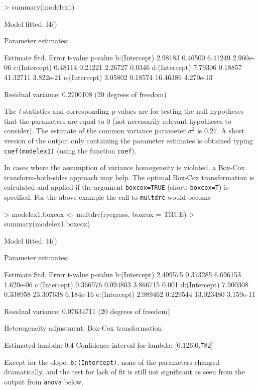 \documentclass[a4paper]{article}
\begin{document}
\begin{Schunk}
\begin{Sinput}
> summary(modelex1)
\end{Sinput}
\begin{Soutput}
Model fitted: l4()

Parameter estimates:

              Estimate Std. Error  t-value   p-value
b:(Intercept)  2.98183    0.46500  6.41249 2.960e-06
c:(Intercept)  0.48114    0.21221  2.26727    0.0346
d:(Intercept)  7.79306    0.18857 41.32711 3.822e-21
e:(Intercept)  3.05802    0.18574 16.46386 4.270e-13

Residual variance: 0.2700108 (20 degrees of freedom)
\end{Soutput}
\end{Schunk}
The \emph{t}-statistics and corresponding p-values are for testing the null hypotheses that the parameters are equal to 0 (not
necessarily relevant hypotheses to consider). The estimate of the common variance parameter $\sigma^2$ is 
0.27.
A short version of the output only containing the parameter estimates is obtained typing \verb+coef(modelex1)+ (using the function \verb+coef+).



In cases where the assumption of variance homogeneity is violated, a Box-Cox transform-both-sides approach may help. The optimal
Box-Cox transformation is calculated and applied if the argument \verb+boxcox=TRUE+ (short: \verb+boxcox=T+) is specified. For the
above example the call to \verb+multdrc+ would become

\begin{Schunk}
\begin{Sinput}
> modelex1.boxcox <- multdrc(ryegrass, boxcox = TRUE)
> summary(modelex1.boxcox)
\end{Sinput}
\begin{Soutput}
Model fitted: l4()

Parameter estimates:

               Estimate Std. Error   t-value   p-value
b:(Intercept)  2.499575   0.373285  6.696153 1.620e-06
c:(Intercept)  0.366576   0.094803  3.866715     0.001
d:(Intercept)  7.900308   0.338958 23.307638 6.184e-16
e:(Intercept)  2.989462   0.229544 13.023480 3.159e-11

Residual variance: 0.07634711 (20 degrees of freedom)

Heterogeneity adjustment: Box-Cox transformation

Estimated lambda: 0.4 
Confidence interval for lambda: [0.126,0.782] 
\end{Soutput}
\end{Schunk}
Except for the slope, \verb+b:(Intercept)+, none of the parameters changed dramatically, and the test for lack of fit is still not significant as seen from the
output from \verb+anova+ below.
\end{document}
